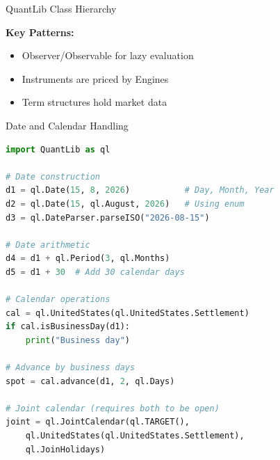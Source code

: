\documentclass[aspectratio=169,11pt]{beamer}
\begin{document}
\begin{frame}{QuantLib Class Hierarchy}
\begin{center}
\end{center}

\textbf{Key Patterns:}
\begin{itemize}
    \item Observer/Observable for lazy evaluation
    \item Instruments are priced by Engines
    \item Term structures hold market data
\end{itemize}
\end{frame}

\begin{frame}[fragile]{Date and Calendar Handling}
\begin{lstlisting}[language=Python]
import QuantLib as ql

# Date construction
d1 = ql.Date(15, 8, 2026)           # Day, Month, Year
d2 = ql.Date(15, ql.August, 2026)   # Using enum
d3 = ql.DateParser.parseISO("2026-08-15")

# Date arithmetic
d4 = d1 + ql.Period(3, ql.Months)
d5 = d1 + 30  # Add 30 calendar days

# Calendar operations
cal = ql.UnitedStates(ql.UnitedStates.Settlement)
if cal.isBusinessDay(d1):
    print("Business day")

# Advance by business days
spot = cal.advance(d1, 2, ql.Days)

# Joint calendar (requires both to be open)
joint = ql.JointCalendar(ql.TARGET(),
    ql.UnitedStates(ql.UnitedStates.Settlement),
    ql.JoinHolidays)
\end{lstlisting}
\end{frame}
\end{document}
